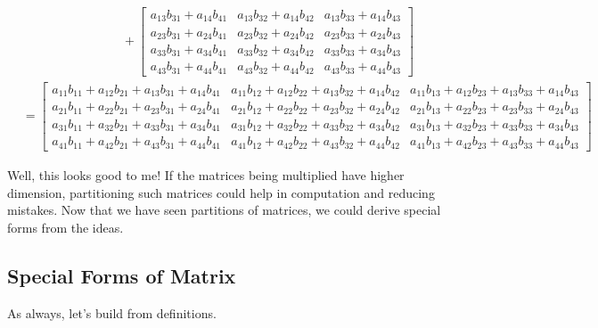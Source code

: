 \documentclass[../main.tex]{subfiles}
\begin{document}
\begin{align*}
&\qquad\qquad\qquad\qquad+
\begin{bmatrix}
    a_{13}b_{31} + a_{14}b_{41} &
    a_{13}b_{32} + a_{14}b_{42} &
    a_{13}b_{33} + a_{14}b_{43} \\
    a_{23}b_{31} + a_{24}b_{41} &
    a_{23}b_{32} + a_{24}b_{42} &
    a_{23}b_{33} + a_{24}b_{43} \\
    a_{33}b_{31} + a_{34}b_{41} &
    a_{33}b_{32} + a_{34}b_{42} &
    a_{33}b_{33} + a_{34}b_{43} \\
    a_{43}b_{31} + a_{44}b_{41} &
    a_{43}b_{32} + a_{44}b_{42} &
    a_{43}b_{33} + a_{44}b_{43}
\end{bmatrix} \\
&=
\begin{bmatrix}
    \scriptstyle
    a_{11}b_{11} + a_{12}b_{21} + a_{13}b_{31} + a_{14}b_{41} &
    \scriptstyle
    a_{11}b_{12} + a_{12}b_{22} + a_{13}b_{32} + a_{14}b_{42} &
    \scriptstyle
    a_{11}b_{13} + a_{12}b_{23} + a_{13}b_{33} + a_{14}b_{43} \\
    \scriptstyle
    a_{21}b_{11} + a_{22}b_{21} + a_{23}b_{31} + a_{24}b_{41} &
    \scriptstyle
    a_{21}b_{12} + a_{22}b_{22} + a_{23}b_{32} + a_{24}b_{42} &
    \scriptstyle
    a_{21}b_{13} + a_{22}b_{23} + a_{23}b_{33} + a_{24}b_{43} \\
    \scriptstyle
    a_{31}b_{11} + a_{32}b_{21} + a_{33}b_{31} + a_{34}b_{41} &
    \scriptstyle
    a_{31}b_{12} + a_{32}b_{22} + a_{33}b_{32} + a_{34}b_{42} &
    \scriptstyle
    a_{31}b_{13} + a_{32}b_{23} + a_{33}b_{33} + a_{34}b_{43} \\
    \scriptstyle
    a_{41}b_{11} + a_{42}b_{21} + a_{43}b_{31} + a_{44}b_{41} &
    \scriptstyle
    a_{41}b_{12} + a_{42}b_{22} + a_{43}b_{32} + a_{44}b_{42} &
    \scriptstyle
    a_{41}b_{13} + a_{42}b_{23} + a_{43}b_{33} + a_{44}b_{43}
\end{bmatrix}
\end{align*}

Well, this looks good to me! If the matrices being multiplied
have higher dimension, partitioning such matrices could help in
computation and reducing mistakes. Now that we have seen partitions
of matrices, we could derive special forms from the ideas.

\subsection{Special Forms of Matrix}

As always, let's build from definitions.
\end{document}
